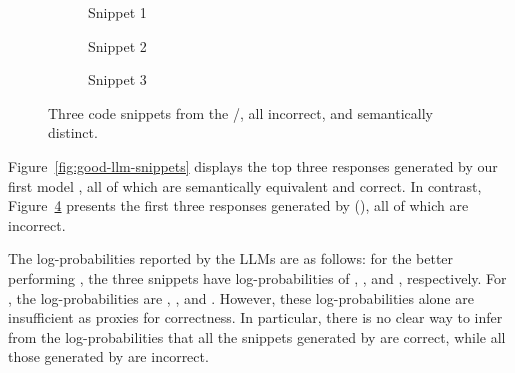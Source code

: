 \begin{figure}[ht!]
    \centering
    
    \begin{subfigure}[t]{0.3\textwidth}
       
        \vspace{0.5em} 
        
        \caption{Snippet 1}
        \label{lst:bad1}
    \end{subfigure}
    \hfill
    \begin{subfigure}[t]{0.3\textwidth}
        
        \vspace{0.5em}
        
        \caption{Snippet 2}
        \label{lst:bad2}
    \end{subfigure}
    \hfill
    \begin{subfigure}[t]{0.3\textwidth}
        
        \vspace{0.5em}
        
        \caption{Snippet 3}
        \label{lst:bad3}
    \end{subfigure}

    \caption{Three code snippets from the \salesforce/\codegenmonoC, all incorrect, and semantically distinct.}
    \label{fig:bad-llm-snippets}
\end{figure}


Figure~\ref{fig:good-llm-snippets} displays the top three responses generated by our first model \gptturbo, all of which are semantically equivalent and correct. 
In contrast, Figure~\ref{fig:bad-llm-snippets} presents the first three responses generated by \salesforce (\codegenmonoC), all of which are incorrect.

The log-probabilities reported by the LLMs are as follows: for the better performing \gptturbo, the three snippets have log-probabilities of \GPTsnipLogProbA, \GPTsnipLogProbB, and \GPTsnipLogProbC, respectively. 
For \codegenmonoC, the log-probabilities are \SFsnipLogProbA, \SFsnipLogProbB, and \SFsnipLogProbC. 
However, these log-probabilities alone are insufficient as proxies for correctness. 
In particular, there is no clear way to infer from the log-probabilities that all the snippets generated by \gptturbo are correct, while all those generated by \codegenmonoC are incorrect.

